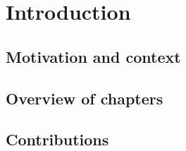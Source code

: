 \chapter[Introduction]{Introduction}


\section{Motivation and context}


\section{Overview of chapters}


\section{Contributions}
